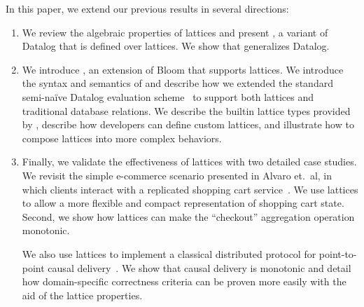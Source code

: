 In this paper, we extend our previous results in several directions:
\begin{enumerate}
\item
  We review the algebraic properties of lattices and present \baselang, a
  variant of Datalog that is defined over lattices. We show that \baselang
  generalizes Datalog.

\item
  We introduce \lang, an extension of Bloom that supports lattices. We introduce
  the syntax and semantics of \lang and describe how we extended the standard
  semi-na\"{i}ve Datalog evaluation scheme~\cite{Balbin1987} to support both
  lattices and traditional database relations. We describe the builtin lattice
  types provided by \lang, describe how developers can define custom lattices,
  and illustrate how to compose lattices into more complex behaviors.

\item
  Finally, we validate the effectiveness of lattices with two detailed case
  studies. We revisit the simple e-commerce scenario presented in Alvaro et.\
  al, in which clients interact with a replicated shopping cart
  service~\cite{Alvaro2011}. We use lattices to allow a more flexible and
  compact representation of shopping cart state. Second, we show how lattices
  can make the ``checkout'' aggregation operation monotonic.

  We also use lattices to implement a classical distributed protocol for
  point-to-point causal delivery~\cite{Schiper1989}. We show that causal
  delivery is monotonic and detail how domain-specific correctness criteria can
  be proven more easily with the aid of the lattice properties.
\end{enumerate}

